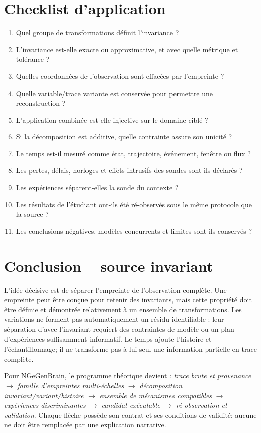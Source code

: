 \documentclass[11pt,oneside]{book}
\theoremstyle{definition}
\theoremstyle{remark}
\newcommand{\1}{\mathbf 1}
\begin{document}
\section*{Checklist d'application}
\begin{enumerate}[label=\textbf{I\arabic*.}]
\item Quel groupe de transformations définit l'invariance ?
\item L'invariance est-elle exacte ou approximative, et avec quelle métrique et tolérance ?
\item Quelles coordonnées de l'observation sont effacées par l'empreinte ?
\item Quelle variable/trace variante est conservée pour permettre une reconstruction ?
\item L'application combinée est-elle injective sur le domaine ciblé ?
\item Si la décomposition est additive, quelle contrainte assure son unicité ?
\item Le temps est-il mesuré comme état, trajectoire, événement, fenêtre ou flux ?
\item Les pertes, délais, horloges et effets intrusifs des sondes sont-ils déclarés ?
\item Les expériences séparent-elles la sonde du contexte ?
\item Les résultats de l'étudiant ont-ils été ré-observés sous le même protocole que la source ?
\item Les conclusions négatives, modèles concurrents et limites sont-ils conservés ?
\end{enumerate}

\section*{Conclusion -- source invariant}
L'idée décisive est de séparer l'empreinte de l'observation complète. Une empreinte peut être conçue pour retenir des invariants, mais cette propriété doit être définie et démontrée relativement à un ensemble de transformations. Les variations ne forment pas automatiquement un résidu identifiable : leur séparation d'avec l'invariant requiert des contraintes de modèle ou un plan d'expériences suffisamment informatif. Le temps ajoute l'histoire et l'échantillonnage; il ne transforme pas à lui seul une information partielle en trace complète.

Pour NGeGenBrain, le programme théorique devient : \emph{trace brute et provenance} \(\to\) \emph{famille d'empreintes multi-échelles} \(\to\) \emph{décomposition invariant/variant/histoire} \(\to\) \emph{ensemble de mécanismes compatibles} \(\to\) \emph{expériences discriminantes} \(\to\) \emph{candidat exécutable} \(\to\) \emph{ré-observation et validation}. Chaque flèche possède son contrat et ses conditions de validité; aucune ne doit être remplacée par une explication narrative.
\end{document}
